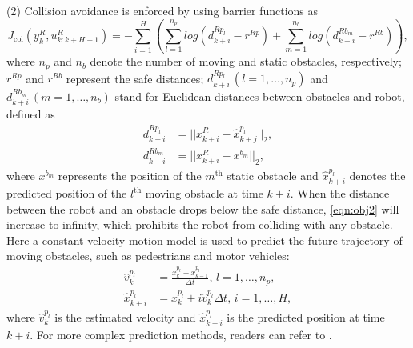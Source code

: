 \documentclass[twocolumn,10pt]{asme2e}
\newcommand{\todonote}[1]{\vspace{0px} %
\todo[inline, color=green!30]{\textbf{[Note:]} {#1}} %
}
\begin{document}
(2) 
Collision avoidance is enforced by using barrier functions as
\begin{equation}\label{eqn:obj2}
J_\text{col}(y^R_k,u^R_{k:k+H-1}) = -\sum\limits_{i=1}^{H}(\sum\limits_{l=1}^{n_p}log(d^{Rp_l}_{k+i}-r^{Rp})+\sum\limits_{m=1}^{n_b}log(d^{Rb_m}_{k+i}-r^{Rb})),
\end{equation}
where $n_p$ and $n_b$ denote the number of moving and static obstacles, respectively;
$r^{Rp}$ and $r^{Rb}$ represent the safe distances;
$d^{Rp_l}_{k+i}\,(l=1,\dots,n_p)$ and $d^{Rb_m}_{k+i}\,(m=1,\dots,n_b)$ stand for Euclidean distances between obstacles and robot, defined as
\begin{subequations}%
	\begin{align}
	d^{Rp_l}_{k+i}&=||x^R_{k+i}-\hat{x}^{p_l}_{k+j}||_2,\\
	d^{Rb_m}_{k+i}&=||x^R_{k+i}-x^{b_m}||_2,
	\end{align}
\end{subequations}
where $x^{b_m}$ represents the position of the $m^\text{th}$ static obstacle and $\hat{x}^{p_l}_{k+i}$ denotes the predicted position of the $l^\text{th}$ moving obstacle at time $k+i$.
When the distance between the robot and an obstacle drops below the safe distance, \cref{eqn:obj2} will increase to infinity, which prohibits the robot from colliding with any obstacle.
Here a constant-velocity motion model is used to predict the future trajectory of moving obstacles, such as pedestrians and motor vehicles: 
\begin{subequations}
	\begin{align}
	\hat{v}^{p_l}_k&=\frac{x^{p_l}_k-x^{p_l}_{k-1}}{\Delta t},\,l=1,\dots,n_p,\\
	\hat{x}^{p_l}_{k+i}&=x^{p_l}_k+i\hat{v}^{p_l}_k\Delta t,\,i=1,\dots,H,
	\end{align}
\end{subequations}
where $\hat{v}^{p_l}_k$ is the estimated velocity and $\hat{x}^{p_l}_{k+i}$ is the predicted position at time $k+i$.
For more complex prediction methods, readers can refer to \cite{ferrer2014behavior,bruce2004better}.
\end{document}

